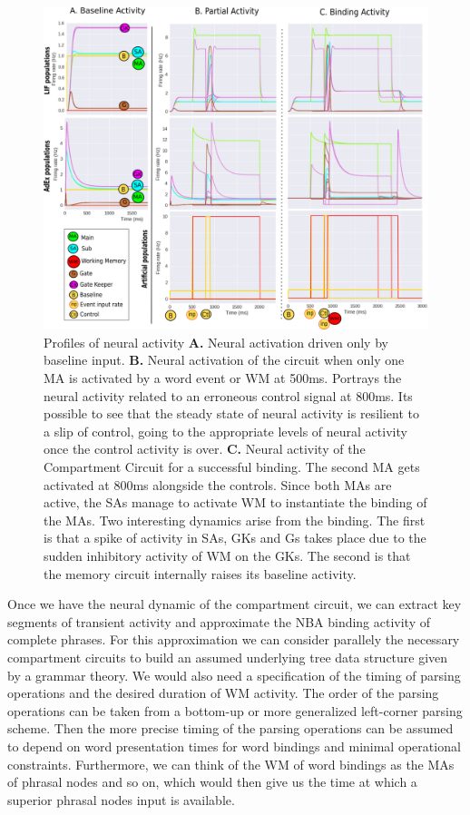 \documentclass[10pt]{article}
\begin{document}
\begin{figure}[h!]
  \begin{center}
    \includegraphics[width=0.70\columnwidth]{figures/compartment_circuit_dynamics/compartment_circuit_dynamics}
    \caption{Profiles of neural activity \textbf{A.} Neural activation driven
      only by baseline input.
\textbf{B.} Neural activation of the circuit when
      only one MA is activated by a word event or WM at 500ms.
      Portrays the neural activity related to an erroneous control
      signal at 800ms.
Its possible to see that the steady state of
      neural activity is resilient to a slip of control, going to the
      appropriate levels of neural activity once the control activity
      is over.
\textbf{C.} Neural activity of the Compartment Circuit for a
      successful binding.
The second MA gets activated at 800ms
      alongside the controls.
Since both MAs are active, the SAs
      manage to activate WM to instantiate the binding of the MAs.
Two
      interesting dynamics arise from the binding.
The first is that a
      spike of activity in SAs, GKs and Gs takes place due to the
      sudden inhibitory activity of WM on the GKs.
The second is that
      the memory circuit internally raises its baseline activity.%
    }

      \label{activity_profiles}
  \end{center}
\end{figure}

Once we have the neural dynamic of the compartment circuit, we can extract key segments of transient activity and approximate the NBA binding activity of complete phrases.
For this approximation we can consider parallely the necessary compartment circuits to build an assumed underlying tree data structure given by a grammar theory.
We would also need a specification of the timing of parsing operations and the desired duration of WM activity.
The order of the parsing operations can be taken from a bottom-up or more generalized left-corner parsing scheme.
Then the more precise timing of the parsing operations can be assumed to depend on word presentation times for word bindings and minimal operational constraints.
Furthermore, we can think of the WM of word bindings as the MAs of phrasal nodes and so on, which would then give us the time at which a superior phrasal nodes input is available.
\end{document}
